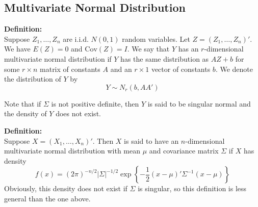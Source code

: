 \documentclass[12pt]{article}
\newcommand{\Cov}{\mathrm{Cov}}
\numberwithin{equation}{section}
\begin{document}
\subsection{Multivariate Normal Distribution}
\textbf{Definition:} \\
Suppose $Z_1, \ldots, Z_n$ are i.i.d. $N(0, 1)$ random variables. Let $Z = (Z_1, \ldots, Z_n)'$. We have $E(Z) = 0$ and $\Cov(Z) = I$. We say that $Y$ has an $r$-dimensional multivariate normal distribution if $Y$ has the same distribution as $AZ + b$ for some $r \times n$ matrix of constants $A$ and an $r \times 1$ vector of constants $b$. We denote the distribution of $Y$ by
\begin{equation*}
  Y \sim N_r(b, AA')
\end{equation*}

Note that if $\Sigma$ is not positive definite, then $Y$ is said to be singular normal and the density of $Y$ does not exist.

\textbf{Definition:} \\
Suppose $X = (X_1, \ldots, X_n)'$. Then $X$ is said to have an $n$-dimensional multivariate normal distribution with mean $\mu$ and covariance matrix $\Sigma$ if $X$ has density
\begin{equation*}
  f(x) = (2\pi)^{-n/2} |\Sigma|^{-1/2} 
    \exp\left\{ -\frac{1}{2} (x - \mu)' \Sigma^{-1} (x - \mu) \right\}
\end{equation*}
%
Obviously, this density does not exist if $\Sigma$ is singular, so this definition is less general than the one above.
\end{document}
